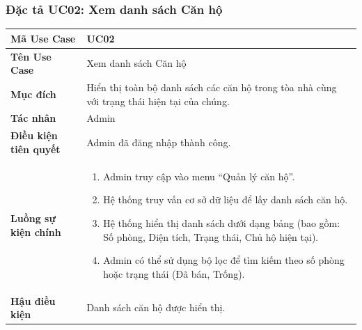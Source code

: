 \documentclass[12pt,a4paper]{article}
\begin{document}
\subsubsection{Đặc tả UC02: Xem danh sách Căn hộ}
\begin{table}[H]
    \centering
    \renewcommand{\arraystretch}{1.2}
    \begin{tabularx}{\textwidth}{|l|X|}
    \hline
    \textbf{Mã Use Case} & \textbf{UC02} \\
    \hline
    \textbf{Tên Use Case} & Xem danh sách Căn hộ \\
    \hline
    \textbf{Mục đích} & Hiển thị toàn bộ danh sách các căn hộ trong tòa nhà cùng với trạng thái hiện tại của chúng. \\
    \hline
    \textbf{Tác nhân} & Admin \\
    \hline
    \textbf{Điều kiện tiên quyết} & Admin đã đăng nhập thành công. \\
    \hline
    \textbf{Luồng sự kiện chính} &
    \begin{enumerate}
        \item Admin truy cập vào menu ``Quản lý căn hộ''.
        \item Hệ thống truy vấn cơ sở dữ liệu để lấy danh sách căn hộ.
        \item Hệ thống hiển thị danh sách dưới dạng bảng (bao gồm: Số phòng, Diện tích, Trạng thái, Chủ hộ hiện tại).
        \item Admin có thể sử dụng bộ lọc để tìm kiếm theo số phòng hoặc trạng thái (Đã bán, Trống).
    \end{enumerate} \\
    \hline
    \textbf{Hậu điều kiện} & Danh sách căn hộ được hiển thị. \\
    \hline
    \end{tabularx}
\end{table}

\end{document}

